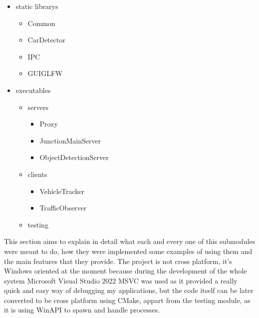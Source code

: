 \documentclass[17pt]{report}
\begin{document}
\begin{itemize}
    \item static librarys
    \begin{itemize}
        \item Common
        \item CarDetector
        \item IPC
        \item GUIGLFW
    \end{itemize}
    
    \item executables
    \begin{itemize}
        \item servers
        \begin{itemize}
            \item Proxy
            \item JunctionMainServer
            \item ObjectDetectionServer
        \end{itemize}
        \item  clients
        \begin{itemize}
            \item VehicleTracker
            \item TrafficObserver
        \end{itemize}
        \item testing
    \end{itemize}
\end{itemize}

This section aims to explain in detail what each and every one of this submodules were meant to do,
how they were implemented some examples of using them and the main features that they
provide. The project is not cross platform, it's Windows oriented at the moment because
during the development of the whole system Microsoft Visual Studio 2022 MSVC was used
as it provided a really quick and easy way of debugging my applications, but 
the code itself can be later converted to be cross platform using CMake, appart from
the testing module, as it is using WinAPI to spawn and handle processes. 


\pagebreak
\end{document}
